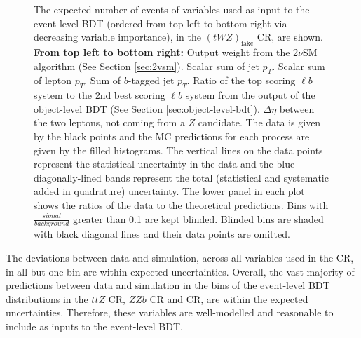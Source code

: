 \begin{figure}[htbp]
\caption{The expected number of events of variables used as input to the event-level BDT (ordered from top left to bottom right via decreasing variable importance), in the $(tWZ)_{\text{fake}}$ CR, are shown. \textbf{From top left to bottom right:} Output weight from the 2$\nu$SM algorithm (See Section \ref{sec:2vsm}). Scalar sum of jet $p_{T}$. Scalar sum of lepton $p_{T}$. Sum of $b$-tagged jet $p_{T}$. Ratio of the top scoring $\ell b$ system to the 2nd best scoring $\ell b$ system from the output of the object-level BDT (See Section \ref{sec:object-level-bdt}). $\Delta \eta$ between the two leptons, not coming from a $Z$ candidate. The data is given by the black points and the MC predictions for each process are given by the filled histograms. The vertical lines on the data points represent the statistical uncertainty in the data and the blue diagonally-lined bands represent the total (statistical and systematic added in quadrature) uncertainty. The lower panel in each plot shows the ratios of the data to the theoretical predictions. Bins with $\frac{signal}{background}$ greater than 0.1 are kept blinded. Blinded bins are shaded with black diagonal lines and their data points are omitted.}
  \label{fig:4lep-tWZfakeCR-eventbdt-vars}
\end{figure}

The deviations between data and simulation, across all variables used in the \tWZfake CR, in all but one bin are within expected uncertainties. Overall, the vast majority of predictions between data and simulation in the bins of the event-level BDT distributions in the $t\bar{t}Z$ CR, $ZZb$ CR and \tWZfake CR, are within the expected uncertainties. Therefore, these variables are well-modelled and reasonable to include as inputs to the event-level BDT.\\

